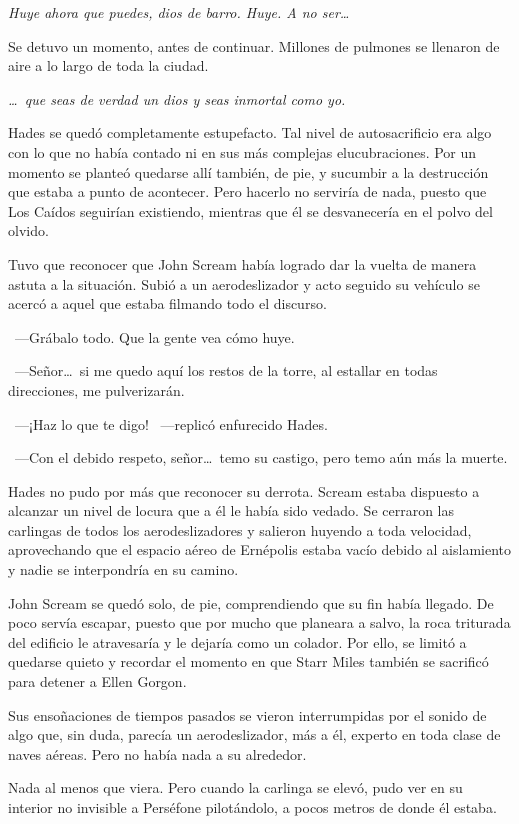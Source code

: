 \emph{Huye ahora que puedes, dios de barro. Huye. A no ser\dots}

Se detuvo un momento, antes de continuar. Millones de pulmones se llenaron de aire a lo largo de toda la ciudad.

\emph{\dots\ que seas de verdad un dios y seas inmortal como yo.}

Hades se quedó completamente estupefacto. Tal nivel de autosacrificio era algo con lo que no había contado ni en sus más complejas elucubraciones. Por un momento se planteó quedarse allí también, de pie, y sucumbir a la destrucción que estaba a punto de acontecer. Pero hacerlo no serviría de nada, puesto que Los Caídos seguirían existiendo, mientras que él se desvanecería en el polvo del olvido.

Tuvo que reconocer que John Scream había logrado dar la vuelta de manera astuta a la situación. Subió a un aerodeslizador y acto seguido su vehículo se acercó a aquel que estaba filmando todo el discurso.

~---Grábalo todo. Que la gente vea cómo huye.

~---Señor\dots\ si me quedo aquí los restos de la torre, al estallar en todas direcciones, me pulverizarán.

~---¡Haz lo que te digo! ~---replicó enfurecido Hades.

~---Con el debido respeto, señor\dots\ temo su castigo, pero temo aún más la muerte.

Hades no pudo por más que reconocer su derrota. Scream estaba dispuesto a alcanzar un nivel de locura que a él le había sido vedado. Se cerraron las carlingas de todos los aerodeslizadores y salieron huyendo a toda velocidad, aprovechando que el espacio aéreo de Ernépolis estaba vacío debido al aislamiento y nadie se interpondría en su camino.

John Scream se quedó solo, de pie, comprendiendo que su fin había llegado. De poco servía escapar, puesto que por mucho que planeara a salvo, la roca triturada del edificio le atravesaría y le dejaría como un colador. Por ello, se limitó a quedarse quieto y recordar el momento en que Starr Miles también se sacrificó para detener a Ellen Gorgon.

Sus ensoñaciones de tiempos pasados se vieron interrumpidas por el sonido de algo que, sin duda, parecía un aerodeslizador, más a él, experto en toda clase de naves aéreas. Pero no había nada a su alrededor.

Nada al menos que viera. Pero cuando la carlinga se elevó, pudo ver en su interior no invisible a Perséfone pilotándolo, a pocos metros de donde él estaba.

